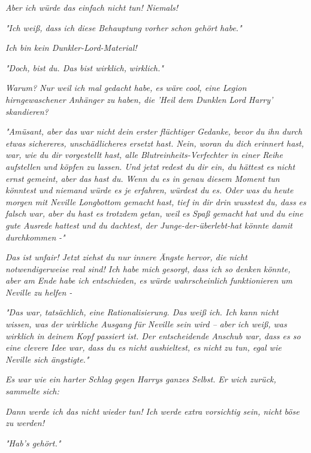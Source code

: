 {\emph{Aber ich würde das einfach nicht tun! Niemals!}

\emph{"Ich weiß, dass ich diese Behauptung vorher schon gehört habe."}

\emph{Ich bin kein Dunkler-Lord-Material!}

\emph{"Doch, bist du. Das bist wirklich,} \emph{wirklich.\emph{"}}

\emph{Warum? Nur weil ich mal gedacht habe, es wäre cool, eine Legion hirngewaschener Anhänger zu haben, die 'Heil dem Dunklen Lord Harry' skandieren?}

\emph{"Amüsant, aber das war nicht dein erster flüchtiger Gedanke, bevor du ihn durch etwas sichereres, unschädlicheres ersetzt hast. Nein, woran du dich} \emph{erinnert hast, war, wie du dir vorgestellt hast, alle Blutreinheits-Verfechter in einer Reihe aufstellen und köpfen zu lassen. Und jetzt redest du dir ein, du hättest es nicht ernst gemeint, aber das hast du. Wenn du es in genau diesem Moment tun könntest und niemand würde es je erfahren, würdest du es. Oder was du heute morgen mit Neville Longbottom gemacht hast, tief in dir drin} \emph{wusstest} \emph{du, dass es falsch war, aber du hast es} \emph{trotzdem} \emph{\emph{getan, weil es}} \emph{Spaß gemacht} \emph{\emph{hat und du eine}} \emph{gute Ausrede} \emph{\emph{hattest und du dachtest, der Junge-der-überlebt-hat könnte damit}} \emph{durchkommen} \emph{\emph{-"}}

\emph{Das ist unfair! Jetzt ziehst du nur innere Ängste hervor, die} \emph{nicht} \emph{\emph{notwendigerweise real sind! Ich habe mich}} \emph{gesorgt,} \emph{\emph{dass ich so denken}} \emph{könnte,} \emph{\emph{aber am Ende habe ich entschieden, es würde wahrscheinlich}} \emph{funktionieren} \emph{\emph{um Neville zu helfen -}}

\emph{"Das war, tatsächlich, eine Rationalisierung. Das weiß ich. Ich kann nicht wissen, was der wirkliche Ausgang für Neville sein wird -- aber ich weiß, was wirklich in deinem Kopf passiert ist. Der entscheidende Anschub war, dass es so eine clevere Idee war, dass du es nicht aushieltest, es} \emph{nicht} \emph{\emph{zu tun, egal wie Neville sich ängstigte."}}

\emph{Es war wie ein harter Schlag gegen Harrys ganzes Selbst. Er wich zurück, sammelte sich:}

\emph{\emph{Dann werde ich das nicht wieder tun! Ich werde extra vorsichtig sein, nicht böse zu werden!}}

\emph{"Hab's gehört."}

}
